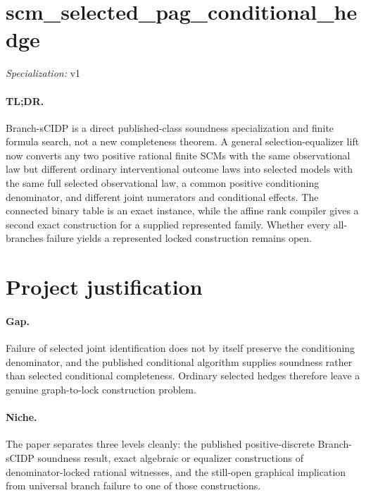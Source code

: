 \documentclass{article}
\begin{document}
\sloppy

\section*{scm\_\allowbreak{}selected\_\allowbreak{}pag\_\allowbreak{}conditional\_\allowbreak{}hedge}

\noindent\textit{Specialization:} v1\par

\paragraph{TL;DR.} Branch-sCIDP is a direct published-class soundness specialization and finite formula search, not a new completeness theorem. A general selection-equalizer lift now converts any two positive rational finite SCMs with the same observational law but different ordinary interventional outcome laws into selected models with the same full selected observational law, a common positive conditioning denominator, and different joint numerators and conditional effects. The connected binary table is an exact instance, while the affine rank compiler gives a second exact construction for a supplied represented family. Whether every all-branches failure yields a represented locked construction remains open.

\section{Project justification}

\paragraph{Gap.} Failure of selected joint identification does not by itself preserve the conditioning denominator, and the published conditional algorithm supplies soundness rather than selected conditional completeness. Ordinary selected hedges therefore leave a genuine graph-to-lock construction problem.

\paragraph{Niche.} The paper separates three levels cleanly: the published positive-discrete Branch-sCIDP soundness result, exact algebraic or equalizer constructions of denominator-locked rational witnesses, and the still-open graphical implication from universal branch failure to one of those constructions.
\end{document}
